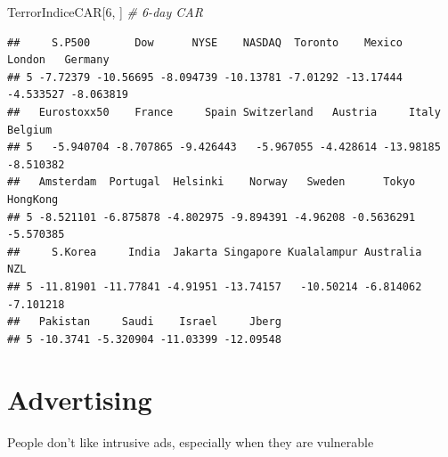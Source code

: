 \documentclass[
]{book}
\newenvironment{Shaded}{\begin{snugshade}}{\end{snugshade}}
\newcommand{\CommentTok}[1]{\textcolor[rgb]{0.56,0.35,0.01}{\textit{#1}}}
\newcommand{\DecValTok}[1]{\textcolor[rgb]{0.00,0.00,0.81}{#1}}
\newcommand{\NormalTok}[1]{#1}
\begin{document}
\begin{Shaded}
\begin{Highlighting}[]
\NormalTok{TerrorIndiceCAR[}\DecValTok{6}\NormalTok{, ] }\CommentTok{# 6-day CAR}
\end{Highlighting}
\end{Shaded}

\begin{verbatim}
##     S.P500       Dow      NYSE    NASDAQ  Toronto    Mexico    London   Germany
## 5 -7.72379 -10.56695 -8.094739 -10.13781 -7.01292 -13.17444 -4.533527 -8.063819
##   Eurostoxx50    France     Spain Switzerland   Austria     Italy   Belgium
## 5   -5.940704 -8.707865 -9.426443   -5.967055 -4.428614 -13.98185 -8.510382
##   Amsterdam  Portugal  Helsinki    Norway   Sweden      Tokyo  HongKong
## 5 -8.521101 -6.875878 -4.802975 -9.894391 -4.96208 -0.5636291 -5.570385
##     S.Korea     India  Jakarta Singapore Kualalampur Australia       NZL
## 5 -11.81901 -11.77841 -4.91951 -13.74157   -10.50214 -6.814062 -7.101218
##   Pakistan     Saudi    Israel     Jberg
## 5 -10.3741 -5.320904 -11.03399 -12.09548
\end{verbatim}

\hypertarget{advertising-1}{%
\chapter{Advertising}\label{advertising-1}}

People don't like intrusive ads, especially when they are vulnerable \citep[p.143]{kellogg_2005}

  
\end{document}
